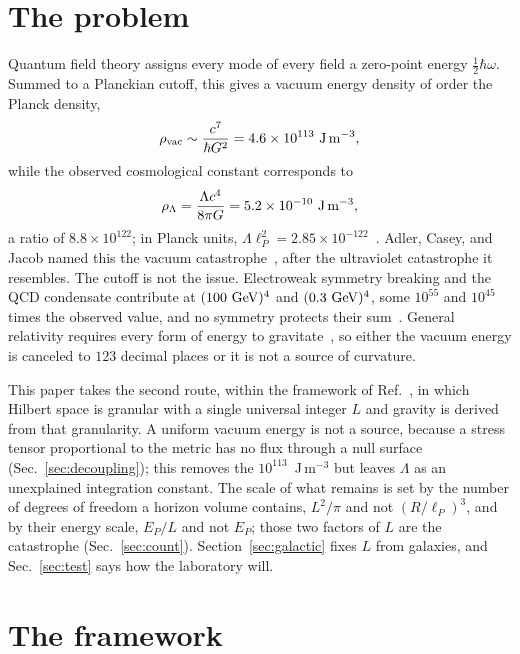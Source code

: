 \documentclass[aps,prd,twocolumn,superscriptaddress,nofootinbib,showkeys]{revtex4-2}
\begin{document}
\section{The problem}
\label{sec:intro}

Quantum field theory assigns every mode of every field a zero-point energy $\tfrac12\hbar\omega$. Summed to a Planckian cutoff, this gives a vacuum energy density of order the Planck density,
\begin{equation}
\rho_{\rm vac}\sim\frac{c^7}{\hbar G^2} = 4.6\times10^{113}~{\rm J\,m^{-3}},
\label{eq:rhovac}
\end{equation}
while the observed cosmological constant corresponds to
\begin{equation}
\rho_\Lambda = \frac{\Lambda c^4}{8\pi G} = 5.2\times10^{-10}~{\rm J\,m^{-3}},
\label{eq:rholam}
\end{equation}
a ratio of $8.8\times10^{122}$; in Planck units, $\Lambda\ell_P^2 = 2.85\times10^{-122}$~\cite{weinberg1989,martin2012}. Adler, Casey, and Jacob named this the vacuum catastrophe~\cite{adler1995}, after the ultraviolet catastrophe it resembles. The cutoff is not the issue. Electroweak symmetry breaking and the QCD condensate contribute at $(100~{\rm GeV})^4$ and $(0.3~{\rm GeV})^4$, some $10^{55}$ and $10^{45}$ times the observed value, and no symmetry protects their sum~\cite{martin2012}. General relativity requires every form of energy to gravitate~\cite{feynman1995}, so either the vacuum energy is canceled to $123$ decimal places or it is not a source of curvature.

This paper takes the second route, within the framework of Ref.~\cite{korytko2026}, in which Hilbert space is granular with a single universal integer $L$ and gravity is derived from that granularity. A uniform vacuum energy is not a source, because a stress tensor proportional to the metric has no flux through a null surface (Sec.~\ref{sec:decoupling}); this removes the $10^{113}$~J\,m$^{-3}$ but leaves $\Lambda$ as an unexplained integration constant. The scale of what remains is set by the number of degrees of freedom a horizon volume contains, $L^2/\pi$ and not $(R/\ell_P)^3$, and by their energy scale, $E_P/L$ and not $E_P$; those two factors of $L$ are the catastrophe (Sec.~\ref{sec:count}). Section~\ref{sec:galactic} fixes $L$ from galaxies, and Sec.~\ref{sec:test} says how the laboratory will.

\section{The framework}
\label{sec:framework}
\end{document}
